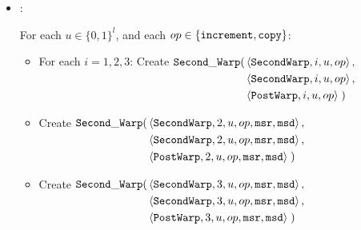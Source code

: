 \begin{itemize}
        \item {\secondwarp}:


        For each $u \in \{0, 1\}^l$, and each $op \in \{ {\tt increment, copy } \}$:
        \begin{itemize}
        \item For each $i = 1, 2, 3$: Create
        $\begin{aligned}[t]
            \secondwarp(& \left\langle {\tt SecondWarp}, i, u, \inc \right\rangle,   \\ %
                        & \left\langle {\tt SecondWarp}, i, u, \inc \right\rangle,   \\ %
                        & \left\langle {\tt PostWarp},   i, u, \inc \right\rangle \;)   %
        \end{aligned}$

        \vspace{0.5cm}

        \item Create
        $\begin{aligned}[t]
            \secondwarp(& \left\langle {\tt SecondWarp}, 2, u, \inc, {\tt msr}, {\tt msd} \right\rangle, \\ %
                        & \left\langle {\tt SecondWarp}, 2, u, \inc, {\tt msr}, {\tt msd} \right\rangle, \\ %
                        & \left\langle {\tt PostWarp},   2, u, \inc, {\tt msr}, {\tt msd} \right\rangle \;) %
        \end{aligned}$
        \vspace{0.5cm}

        \item Create
        $\begin{aligned}[t]
            \secondwarp(& \left\langle {\tt SecondWarp}, 3, u, \inc, {\tt msr}, {\tt msd} \right\rangle, \\ %
                        & \left\langle {\tt SecondWarp}, 3, u, \inc, {\tt msr}, {\tt msd} \right\rangle, \\ %
                        & \left\langle {\tt PostWarp},   3, u, \inc, {\tt msr}, {\tt msd} \right\rangle \;) %
        \end{aligned}$
        \end{itemize}


\end{itemize}
